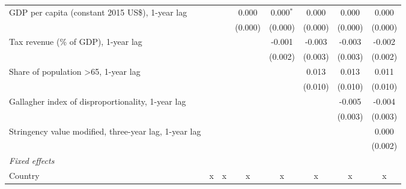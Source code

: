 \begin{tabular}{lccccccc}
   GDP per capita (constant 2015 US\$), 1-year lag                                    &                &                & 0.000          & 0.000$^{*}$    & 0.000         & 0.000         & 0.000\\   
                                                                                      &                &                & (0.000)        & (0.000)        & (0.000)       & (0.000)       & (0.000)\\   
   Tax revenue (\% of GDP), 1-year lag                                                &                &                &                & -0.001         & -0.003        & -0.003        & -0.002\\   
                                                                                      &                &                &                & (0.002)        & (0.003)       & (0.003)       & (0.002)\\   
   Share of population >65, 1-year lag                                                &                &                &                &                & 0.013         & 0.013         & 0.011\\   
                                                                                      &                &                &                &                & (0.010)       & (0.010)       & (0.010)\\   
   Gallagher index of disproportionality, 1-year lag                                  &                &                &                &                &               & -0.005        & -0.004\\   
                                                                                      &                &                &                &                &               & (0.003)       & (0.003)\\   
   Stringency value modified, three-year lag, 1-year lag                              &                &                &                &                &               &               & 0.000\\   
                                                                                      &                &                &                &                &               &               & (0.002)\\   
   \emph{Fixed effects}\\
   Country                                                                            & x              & x              & x              & x              & x             & x             & x\\  

\end{tabular}
